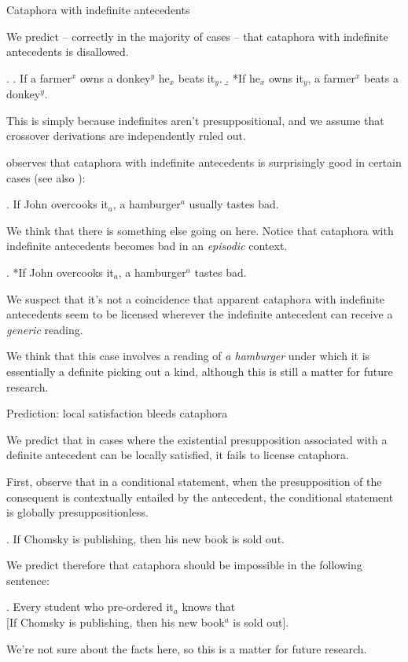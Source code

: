\documentclass{beamer}
\begin{document}
\begin{frame}[allowframebreaks]{Cataphora with indefinite antecedents}

  We predict -- correctly in the majority of cases -- that cataphora with indefinite antecedents is disallowed.

  \exi.
  \a. If a farmer\(^{x}\) owns a donkey\(^{y}\) he\(_{x}\) beats it\(_{y}\).
  \b. *If he\(_{x}\) owns it\(_{y}\), a farmer\(^{x}\) beats a donkey\(^{y}\).

  This is simply because indefinites aren't presuppositional, and we assume that crossover derivations are independently ruled out.

  \framebreak

  \citet[p.\,192]{chierchia_dynamics_1995} observes that cataphora with indefinite antecedents is surprisingly good in certain cases (see also \citealt{barkerShan2008}):

  \ex. If John overcooks it\(_{a}\), a hamburger\(^{a}\) usually tastes bad.

  \framebreak

  We think that there is something else going on here. Notice that cataphora with indefinite antecedents becomes bad in an \textit{episodic} context.

  \ex. *If John overcooks it\(_{a}\), a hamburger\(^{a}\) tastes bad.

  We suspect that it's not a coincidence that apparent cataphora with indefinite antecedents seem to be licensed wherever the indefinite antecedent can receive a \textit{generic} reading.

  We think that this case involves a reading of \textit{a hamburger} under which it is essentially a definite picking out a kind, although this is still a matter for future research.

\end{frame}

\begin{frame}[allowframebreaks]{Prediction: local satisfaction bleeds cataphora}

  We predict that in cases where the existential presupposition associated with a definite antecedent can be locally satisfied, it fails to license cataphora.

  First, observe that in a conditional statement, when the presupposition of the consequent is contextually entailed by the antecedent, the conditional statement is globally presuppositionless.

  \ex. If Chomsky is publishing, then his new book is sold out.

  \framebreak

  We predict therefore that cataphora should be impossible in the following sentence:

  \ex. Every student who pre-ordered it\(_{a}\) knows that\\
  {[}If Chomsky is publishing, then his new book\(^{a}\) is sold out].

  We're not sure about the facts here, so this is a matter for future research.

\end{frame}
\end{document}
